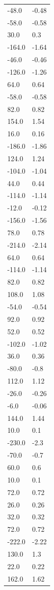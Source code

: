 \begin{longtable}{ll}
-48.0 & -0.48 \\
-58.0 & -0.58 \\
30.0 & 0.3 \\
-164.0 & -1.64 \\
-46.0 & -0.46 \\
-126.0 & -1.26 \\
64.0 & 0.64 \\
-58.0 & -0.58 \\
82.0 & 0.82 \\
154.0 & 1.54 \\
16.0 & 0.16 \\
-186.0 & -1.86 \\
124.0 & 1.24 \\
-104.0 & -1.04 \\
44.0 & 0.44 \\
-114.0 & -1.14 \\
-12.0 & -0.12 \\
-156.0 & -1.56 \\
78.0 & 0.78 \\
-214.0 & -2.14 \\
64.0 & 0.64 \\
-114.0 & -1.14 \\
82.0 & 0.82 \\
108.0 & 1.08 \\
-54.0 & -0.54 \\
92.0 & 0.92 \\
52.0 & 0.52 \\
-102.0 & -1.02 \\
36.0 & 0.36 \\
-80.0 & -0.8 \\
112.0 & 1.12 \\
-26.0 & -0.26 \\
-6.0 & -0.06 \\
144.0 & 1.44 \\
10.0 & 0.1 \\
-230.0 & -2.3 \\
-70.0 & -0.7 \\
60.0 & 0.6 \\
10.0 & 0.1 \\
72.0 & 0.72 \\
26.0 & 0.26 \\
32.0 & 0.32 \\
72.0 & 0.72 \\
-222.0 & -2.22 \\
130.0 & 1.3 \\
22.0 & 0.22 \\
162.0 & 1.62 \\

\end{longtable}
